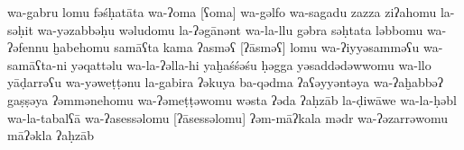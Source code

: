 \begin{transliteration}
    wa-gabru
    lomu fəśḥatāta wa-ʔoma [ʕoma] wa-gəlfo wa-sagadu zazza ziʔahomu
    la-səḥit wa-yəzabbəḥu wəludomu la-ʔəgānənt wa-la-llu gəbra
    səḥtata ləbbomu
    wa-ʔəfennu ḫabehomu samāʕta kama
    ʔasməʕ [ʔāsməʕ] lomu wa-ʔiyyəsamməʕu  wa-samāʕta-ni yəqattəlu wa-la-ʔəlla-hi
    yaḫaśśəśu ḥəgga yəsaddədəwwomu wa-llo yāḍarrəʕu wa-yəweṭṭənu la-gabira
    ʔəkuya ba-qədma ʔaʕəyyəntəya
    wa-ʔaḫabbəʔ gaṣṣəya
    ʔəmmənehomu wa-ʔəmeṭṭəwomu wəsta ʔəda ʔaḥzāb la-ḍiwāwe
    wa-la-ḥəbl wa-la-tabalʕā wa-ʔasessəlomu [ʔāsessəlomu] ʔəm-māʔkala mədr
    wa-ʔəzarrəwomu māʔəkla ʔaḥzāb

\end{transliteration}
